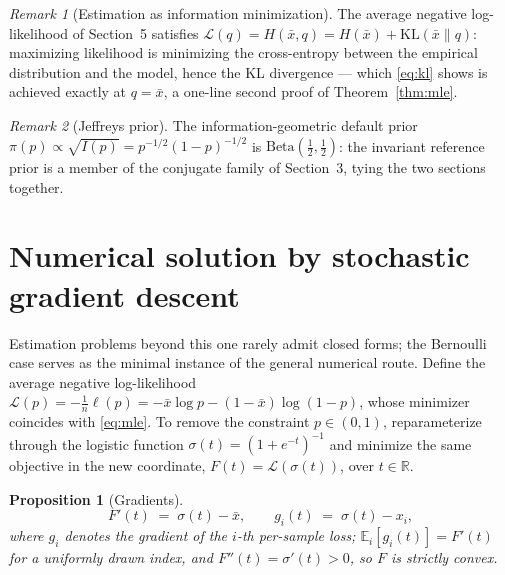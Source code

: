 \documentclass[11pt]{article}
\newtheorem{proposition}{Proposition}
\theoremstyle{remark}
\newtheorem{remark}{Remark}
\newcommand{\E}{\mathbb{E}}
\newcommand{\xbar}{\bar{x}}
\begin{document}
\begin{remark}[Estimation as information minimization]
The average negative log-likelihood of Section~5 satisfies
$\mathcal{L}(q) = H(\xbar, q) = H(\xbar) + \mathrm{KL}(\xbar \| q)$:
maximizing likelihood is minimizing the cross-entropy between the
empirical distribution and the model, hence the KL divergence ---
which \eqref{eq:kl} shows is achieved exactly at $q = \xbar$, a
one-line second proof of Theorem~\ref{thm:mle}.
\end{remark}

\begin{remark}[Jeffreys prior]
The information-geometric default prior
$\pi(p) \propto \sqrt{I(p)} = p^{-1/2}(1-p)^{-1/2}$ is
$\mathrm{Beta}(\tfrac12, \tfrac12)$: the invariant reference prior is
a member of the conjugate family of Section~3, tying the two sections
together.
\end{remark}

\section{Numerical solution by stochastic gradient descent}

Estimation problems beyond this one rarely admit closed forms; the
Bernoulli case serves as the minimal instance of the general
numerical route. Define the average negative log-likelihood
$\mathcal{L}(p) = -\tfrac1n \ell(p) = -\xbar \log p -
(1-\xbar)\log(1-p)$, whose minimizer coincides with \eqref{eq:mle}.
To remove the constraint $p \in (0,1)$, reparameterize through the
logistic function $\sigma(t) = (1 + e^{-t})^{-1}$ and minimize the
same objective in the new coordinate, $F(t) =
\mathcal{L}(\sigma(t))$, over $t \in \mathbb{R}$.

\begin{proposition}[Gradients]
\begin{equation}
  \boxed{\;F'(t) \;=\; \sigma(t) - \xbar,
  \qquad
  g_i(t) \;=\; \sigma(t) - x_i,\;}
  \label{eq:grad}
\end{equation}
where $g_i$ denotes the gradient of the $i$-th per-sample loss;
$\E_i[g_i(t)] = F'(t)$ for a uniformly drawn index, and
$F''(t) = \sigma'(t) > 0$, so $F$ is strictly convex.
\end{proposition}
\end{document}
